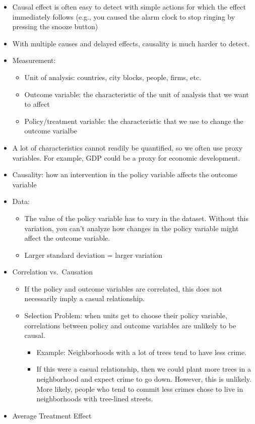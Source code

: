 \documentclass[]{book}
\providecommand{\tightlist}{%
  \setlength{\itemsep}{0pt}\setlength{\parskip}{0pt}}
\begin{document}
\begin{itemize}
\item
  Causal effect is often easy to detect with simple actions for which the effect immediately follows (e.g., you caused the alarm clock to stop ringing by pressing the snooze button)
\item
  With multiple causes and delayed effects, causality is much harder to detect.
\item
  Measurement:

  \begin{itemize}
  \tightlist
  \item
    Unit of analysis: countries, city blocks, people, firms, etc.
  \item
    Outcome variable: the characteristic of the unit of analysis that we want to affect
  \item
    Policy/treatment variable: the characteristic that we use to change the outcome varialbe
  \end{itemize}
\item
  A lot of characteristics cannot readily be quantified, so we often use proxy variables. For example, GDP could be a proxy for economic development.
\item
  Causality: how an intervention in the policy variable affects the outcome variable
\item
  Data:

  \begin{itemize}
  \tightlist
  \item
    The value of the policy variable has to vary in the dataset. Without this variation, you can't analyze how changes in the policy variable might affect the outcome variable.
  \item
    Larger standard deviation = larger variation
  \end{itemize}
\item
  Correlation vs.~Causation

  \begin{itemize}
  \tightlist
  \item
    If the policy and outcome variables are correlated, this does not necessarily imply a casual relationship.
  \item
    Selection Problem: when units get to choose their policy variable, correlations between policy and outcome variables are unlikely to be causal.

    \begin{itemize}
    \tightlist
    \item
      Example: Neighborhoods with a lot of trees tend to have less crime.
    \item
      If this were a casual relationship, then we could plant more trees in a neighborhood and expect crime to go down. However, this is unlikely. More likely, people who tend to commit less crimes chose to live in neighborhoods with tree-lined streets.
    \end{itemize}
  \end{itemize}
\item
  Average Treatment Effect


\end{itemize}
\end{document}
